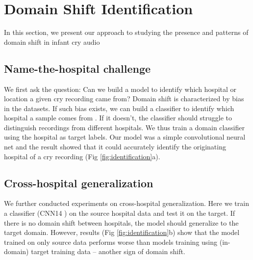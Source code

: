 \documentclass{article}
\begin{document}
\section{Domain Shift Identification}
\label{sec:domain_shift_id}

In this section, we present our approach to studying the presence and patterns of domain shift in infant cry audio

\subsection{Name-the-hospital challenge}
We first ask the question: Can we build a model to identify which hospital or location a given cry recording came from? Domain shift is characterized by bias in the datasets. If such bias exists, we can build a classifier to identify which hospital a sample comes from \cite{5995347}. If it doesn't, the classifier should struggle to distinguish recordings from different hospitals. We thus train a domain classifier using the hospital as target labels. Our model was a simple convolutional neural net and the result showed that it could accurately identify the originating hospital of a cry recording (Fig \ref{fig:identification}a).

\subsection{Cross-hospital generalization}
We further conducted experiments on cross-hospital generalization. Here we train a classifier (CNN14 \cite{kong2020panns}) on the source hospital data and test it on the target. If there is no domain shift between hospitals, the model should generalize to the target domain. However, results (Fig \ref{fig:identification}b) show that the model trained on only source data performs worse than models training using (in-domain) target training data -- another sign of domain shift.
\end{document}
